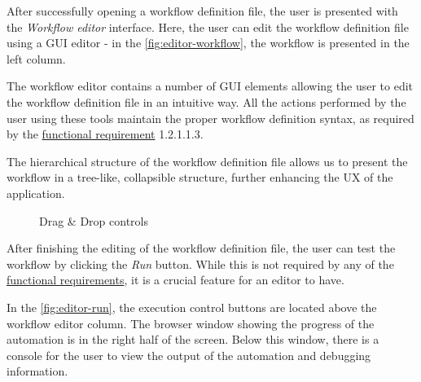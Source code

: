 After successfully opening a workflow definition file, the user is presented with the \textit{Workflow editor} interface. 
Here, the user can edit the workflow definition file using a \ac{GUI} editor - in the \autoref{fig:editor-workflow}, the workflow is presented in the left column.

The workflow editor contains a number of \ac{GUI} elements allowing the user to edit the workflow definition file in an intuitive way.
All the actions performed by the user using these tools maintain the proper workflow definition syntax, as required by the \hyperref[requirements]{functional requirement} 1.2.1.1.3.

The hierarchical structure of the workflow definition file allows us to present the workflow in a tree-like, collapsible structure, further enhancing the \ac{UX} of the application.

\begin{figure}[h!]
    \begin{center}
    \end{center}
    \caption{Drag \& Drop controls}
\end{figure}
\clearpage

After finishing the editing of the workflow definition file, the user can test the workflow by clicking the \textit{Run} button.
While this is not required by any of the \hyperref[requirements]{functional requirements}, it is a crucial feature for an editor to have.

In the \autoref{fig:editor-run}, the execution control buttons are located above the workflow editor column. 
The browser window showing the progress of the automation is in the right half of the screen.
Below this window, there is a console for the user to view the output of the automation and debugging information.

